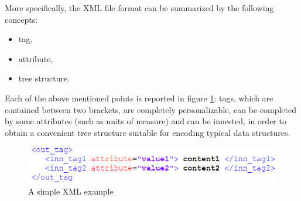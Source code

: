\bigskip
\noindent
More specifically, the XML file format can be summarized by the following concepts:
%
\begin{itemize}
\item tag,
\item attribute,
\item tree structure.
\end{itemize}
%
Each of the above mentioned points is reported in figure \ref{fig:xmlExample}: tags, which are contained between two brackets, are completely personalizable, can be completed by some attributes (such as units of measure) and can be innested, in order to obtain a convenient tree structure suitable for encoding typical data structures.
%
\begin{figure}[H]
\centering
\includegraphics[scale=2.40]{Immagini/Capitolo1/xmlExample}
\caption{A simple XML example}
\label{fig:xmlExample}
\end{figure}
%

